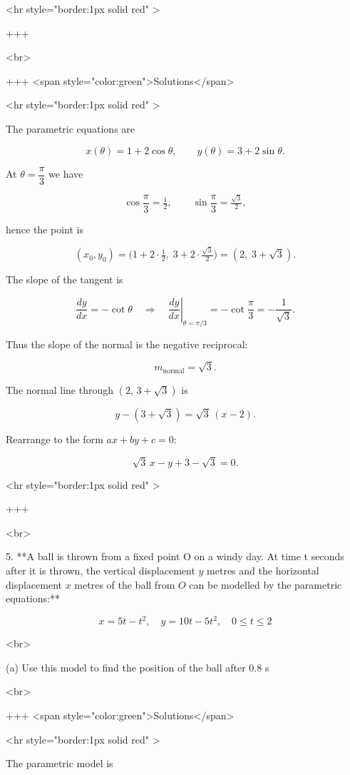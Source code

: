 <hr style="border:1px solid red" >

+++

<br>

+++ <span style="color:green">Solutions</span>

<hr style="border:1px solid red" >

The parametric equations are

$$
x(\theta)=1+2\cos\theta,\qquad y(\theta)=3+2\sin\theta.
$$


At $\theta=\dfrac{\pi}{3}$ we have

$$
\cos\frac{\pi}{3}=\tfrac{1}{2},\qquad \sin\frac{\pi}{3}=\tfrac{\sqrt{3}}{2},
$$

hence the point is

$$
(x_0,y_0)=\bigl(1+2\cdot\tfrac{1}{2},\;3+2\cdot\tfrac{\sqrt{3}}{2}\bigr)=(2,\;3+\sqrt{3}).
$$


The slope of the tangent is

$$
\frac{dy}{dx}=-\cot\theta \quad\Rightarrow\quad
\left.\frac{dy}{dx}\right|_{\theta=\pi/3} = -\cot\frac{\pi}{3} = -\frac{1}{\sqrt{3}}.
$$

Thus the slope of the normal is the negative reciprocal:

$$
m_{\text{normal}}=\sqrt{3}.
$$


The normal line through $(2,\,3+\sqrt{3})$ is

$$
y-(3+\sqrt{3})=\sqrt{3}\,(x-2).
$$

Rearrange to the form $ax+by+c=0$:

$$
\sqrt{3}\,x - y + 3 - \sqrt{3} = 0.
$$

<hr style="border:1px solid red" >

+++

<br>


5. **A ball is thrown from a fixed point O on a windy day. At time t seconds after it is thrown, the vertical displacement $y$ metres and the horizontal displacement $x$ metres of the ball from $O$ can be modelled by the parametric equations:**

$$
x=5 t-t^{2}, \quad y=10 t-5 t^{2}, \quad 0 \leq t \leq 2
$$

<br>

(a) Use this model to find the position of the ball after 0.8 s

<br>

+++ <span style="color:green">Solutions</span>

<hr style="border:1px solid red" >

The parametric model is

